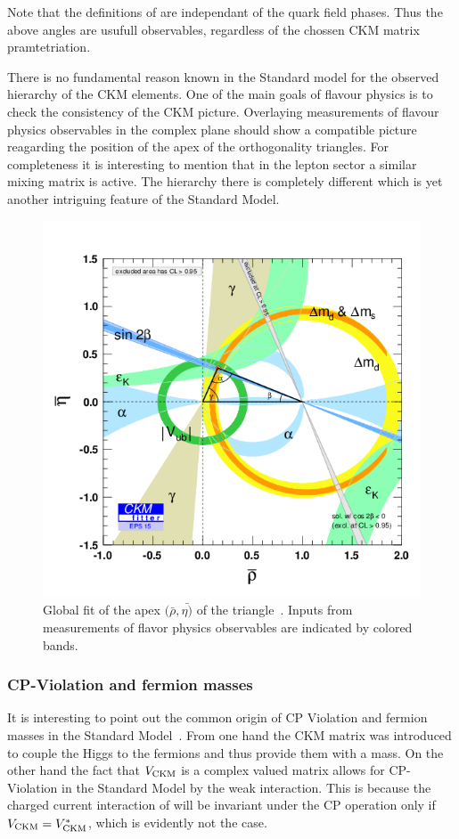 \noindent Note that the definitions of  are independant of
the quark field phases. Thus the above angles are usufull observables, regardless of the chossen
CKM matrix pramtetriation.

There is no fundamental reason known in the Standard model for the observed hierarchy of the CKM elements.
One of the main goals of flavour physics is to check the consistency of the CKM picture.
Overlaying measurements of flavour physics observables in the complex plane should show a compatible
picture reagarding the position of the apex of the orthogonality triangles.
For completeness it is interesting to mention that in the lepton sector a similar mixing matrix is active.
The hierarchy there is completely different which is yet another intriguing feature of the Standard Model.

\begin{figure}[!h]
  \centering
    \includegraphics[trim=0cm 0.5cm 0cm 1.5cm, clip=true, width=\textwidth]{Figures/Chapter1/rhoeta_large.png}
    \caption{Global fit of the apex $(\bar{\rho},\bar{\eta)}$ of the \Bd triangle~\cite{ckm-fitter-phis-pred}.
             Inputs from measurements of flavor physics observables are indicated by colored bands.}
    \label{unitarity_triangle}
\end{figure}

\subsubsection{CP-Violation and fermion masses}
It is interesting to point out the common origin of CP Violation and fermion masses in the Standard Model~\cite{KM-mechanism}.
From one hand the CKM matrix was introduced to couple the Higgs to the fermions and thus provide them with a mass.
On the other hand the fact that $V_{\rm CKM}$ is a complex valued matrix allows for CP-Violation in the
Standard Model by the weak interaction. This is because the charged current interaction of 
will be invariant under the CP operation only if $V_{\rm CKM}=V_{\rm CKM}^*$, which is evidently not the case.
